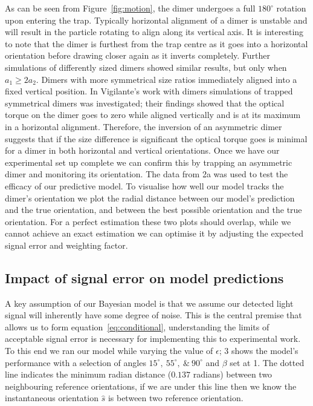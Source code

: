 \documentclass[final, 3p]{elsarticle}
\begin{document}
As can be seen from Figure~\ref{fig:motion}, the dimer undergoes a full $180^{\circ}$ rotation upon entering the trap. Typically horizontal alignment of a dimer is unstable and will result in the particle rotating to align along its vertical axis. It is interesting to note that the dimer is furthest from the trap centre as it goes into a horizontal orientation before drawing closer again as it inverts completely. Further simulations of differently sized dimers showed similar results, but only when $a_1 \geq 2a_2$. Dimers with more symmetrical size ratios immediately aligned into a fixed vertical position. 
In Vigilante's work with dimers \cite{Vigilante2020Brownian_OT} simulations of trapped symmetrical dimers was investigated; their findings showed that the optical torque on the dimer goes to zero while aligned vertically and is at its maximum in a horizontal alignment. Therefore, the inversion of an asymmetric dimer suggests that if the size difference is significant the optical torque goes is minimal for a dimer in both horizontal and vertical orientations. Once we have our experimental set up complete we can confirm this by trapping an asymmetric dimer and monitoring its orientation. The data from \figurename{ 2a} was used to test the efficacy of our predictive model. To visualise how well our model tracks the dimer's orientation we plot the radial distance between our model's prediction and the true orientation, and between the best possible orientation and the true orientation. For a perfect estimation these two plots should overlap, while we cannot achieve an exact estimation we can optimise it by adjusting the expected signal error and weighting factor. 

\subsection{Impact of signal error on model predictions}
\label{sec:3.2}
A key assumption of our Bayesian model is that we assume our detected light signal will inherently have some degree of noise. This is the central premise that allows us to form equation~\eqref{eq:conditional}, understanding the limits of acceptable signal error is necessary for implementing this to experimental work.
To this end we ran our model while varying the value of $\epsilon$; \figurename{ 3} shows the model's performance with a selection of angles $15^{\circ},\ 55^{\circ}, \ \& \ 90^{\circ}$ and $\beta$ set at 1. The dotted line indicates the minimum radian distance ($0.137$ radians) between two neighbouring reference orientations, if we are under this line then we know the instantaneous orientation $\hat{s}$ is between two reference orientation.
\end{document}

